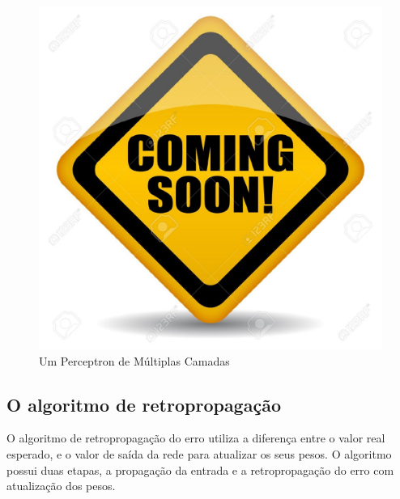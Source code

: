 \begin{figure}[h]
\centering
\includegraphics[scale=0.5]{images/cs}
\caption{Um Perceptron de Múltiplas Camadas}
\label{fig:pmc}
\end{figure}

\subsection{O algoritmo de retropropagação}
\label{sec:RedesNeurais:retropropagação}

O algoritmo de retropropagação do erro utiliza a diferença entre o valor real esperado, e o valor de saída da rede para atualizar os seus pesos. O algoritmo possui duas etapas, a propagação da entrada e a retropropagação do erro com atualização dos pesos.

